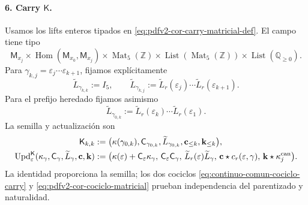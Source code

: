 \paragraph{6. Carry \(\mathsf K\).}
Usamos los lifts enteros tipados en
\eqref{eq:pdfv2-cor-carry-matricial-def}. El campo tiene tipo
\[
 \mathsf M_{x_j}\times
 \operatorname{Hom}(\mathsf M_{x_0},\mathsf M_{x_j})
 \times\operatorname{Mat}_5(\mathbb Z)
 \times\operatorname{List}(\operatorname{Mat}_5(\mathbb Z))
 \times\operatorname{List}(\mathbb Q_{\geq0}).
\]
Para \(\gamma_{k,j}=\varepsilon_j\cdots\varepsilon_{k+1}\), fijamos
explícitamente
\begin{equation}
\label{eq:pdfv2-terminal-lift-entero-ruta}
 \widetilde L_{\gamma_{k,k}}:=I_5,\qquad
 \widetilde L_{\gamma_{k,j}}
 :=\widetilde L_r(\varepsilon_j)\cdots
   \widetilde L_r(\varepsilon_{k+1}).
\end{equation}
Para el prefijo heredado fijamos asimismo
\[
 \widetilde L_{\gamma_{0,k}}
 :=\widetilde L_r(\varepsilon_k)\cdots
   \widetilde L_r(\varepsilon_1).
\]
La semilla y actualización son
\begin{align}
 \mathsf K_{k,k}&:=
 \bigl(\kappa(\gamma_{0,k}),\mathsf C_{\gamma_{0,k}},
       \widetilde L_{\gamma_{0,k}},
       \mathbf c_{\leq k},\mathbf k_{\leq k}\bigr),
 \label{eq:pdfv2-terminal-semilla-k}\\
 \operatorname{Upd}^{\mathsf K}_{\varepsilon}
 (\kappa_\gamma,\mathsf C_\gamma,\widetilde L_\gamma,
   \mathbf c,\mathbf k)
 &:=
 \bigl(\kappa(\varepsilon)+\mathsf C_\varepsilon\kappa_\gamma,\,
 \mathsf C_\varepsilon\mathsf C_\gamma,\,
 \widetilde L_r(\varepsilon)\widetilde L_\gamma,\,
 \mathbf c\star c_r(\varepsilon,\gamma),\,
 \mathbf k\star\kappa_j^{\rm can}\bigr).
 \label{eq:pdfv2-terminal-update-k}
\end{align}
La identidad proporciona la semilla; los dos cociclos
\eqref{eq:continuo-comun-cociclo-carry} y
\eqref{eq:pdfv2-cor-cociclo-matricial} prueban independencia del
parentizado y naturalidad.

